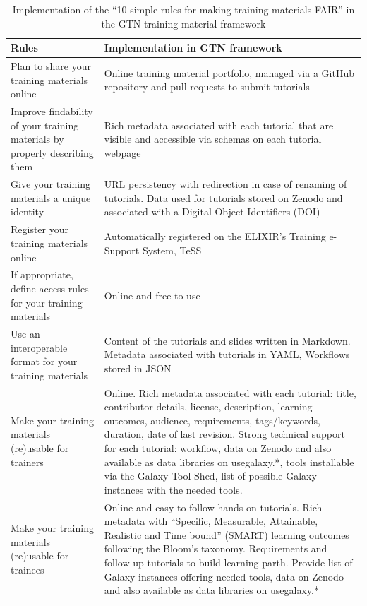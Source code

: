 \documentclass[10pt,letterpaper]{article}
\begin{document}
\begin{table}[h!]
	\centering
    \caption{Implementation of the ``10 simple rules for making training materials FAIR'' in the GTN training material framework
    \label{tbl:rulesforfair}}
	\begin{tabular}{p{}p{}}
		\textbf{Rules}                                                                & \textbf{Implementation in GTN framework}\\\hline
		Plan to share your training materials online                                  & Online training material portfolio, managed via a GitHub repository and pull requests to submit tutorials\\
		Improve findability of your training materials by properly describing them    & Rich metadata associated with each tutorial that are visible and accessible via schemas on each tutorial webpage\\
		Give your training materials a unique identity                                & URL persistency with redirection in case of renaming of tutorials.
		Data used for tutorials stored on Zenodo  and associated with a Digital Object Identifiers (DOI) \\
        Register your training materials online                                       & Automatically registered on the ELIXIR's Training e-Support System, TeSS  \\
        If appropriate, define access rules for your training materials               &	Online and free to use \\
        Use an interoperable format for your training materials                       &	Content of the tutorials and slides written in Markdown. Metadata associated with tutorials in YAML, Workflows stored in JSON\\
		Make your training materials (re)usable for trainers                          & Online. Rich metadata associated with each tutorial: title, contributor details, license, description, learning outcomes, audience, requirements, tags/keywords, duration, date of last revision. Strong technical support for each tutorial: workflow, data on Zenodo and also available as data libraries on usegalaxy.*, tools installable via the Galaxy Tool Shed, list of possible Galaxy instances with the needed tools.\\
		Make your training materials (re)usable for trainees                          & Online and easy to follow hands-on tutorials. Rich metadata with ``Specific, Measurable, Attainable, Realistic and Time bound'' (SMART) learning outcomes following the Bloom's taxonomy. Requirements and follow-up tutorials to build learning parth. Provide list of Galaxy instances offering needed tools, data on Zenodo and also available as data libraries on usegalaxy.*\\

\end{tabular}
\end{table}
\end{document}
